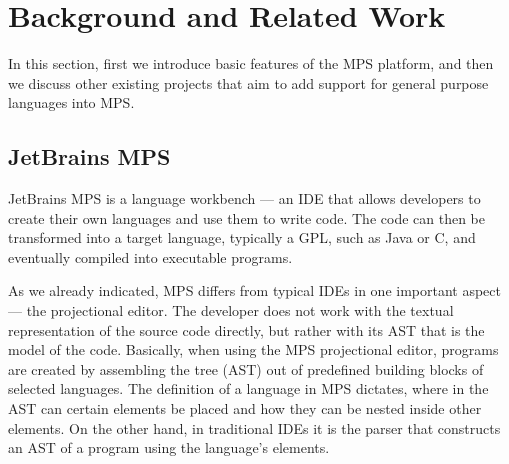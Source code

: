 \section{Background and Related Work}
\label{sect:BACKGRELWORK}

In this section, first we introduce basic features of the MPS platform, and then we discuss other existing projects that aim to add support for general purpose languages into MPS.

\subsection{JetBrains MPS}
\label{sect:MPS}




JetBrains MPS is a language workbench --- an IDE that allows developers to create their own languages and use them to write code.
The code can then be transformed into a target language, typically a GPL, such as Java or C, and eventually compiled into executable programs.

As we already indicated, MPS differs from typical IDEs in one important aspect --- the projectional editor.
The developer does not work with the textual representation of the source code directly, but rather with its AST that is the model of the code.
Basically, when using the MPS projectional editor, programs are created by assembling the tree (AST) out of predefined building blocks of selected languages.
The definition of a language in MPS dictates, where in the AST can certain elements be placed and how they can be nested inside other elements.
On the other hand, in traditional IDEs it is the parser that constructs an AST of a program using the language's elements.

